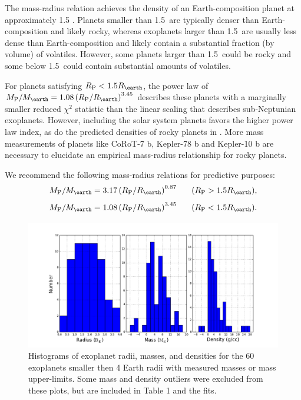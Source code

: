 \documentclass[iop]{emulateapj}
\begin{document}
The mass-radius relation achieves the density of an Earth-composition planet at approximately 1.5 \rearth.   Planets smaller than 1.5\rearth\ are typically denser than Earth-composition and likely rocky, whereas exoplanets larger than 1.5\rearth\ are usually less dense than Earth-composition and likely contain a substantial fraction (by volume) of volatiles.  However, some planets larger than 1.5\rearth\ could be rocky and some below 1.5\rearth\ could contain substantial amounts of volatiles.

For planets satisfying $\rpl < 1.5 \rearth$, the power law of $\mpl/\mearth = 1.08 \left(\rpl/\rearth\right)^{3.45}$ describes these planets with a marginally smaller reduced $\chi^2$ statistic than the linear scaling that describes sub-Neptunian exoplanets.  However, including the solar system planets favors the higher power law index, as do the predicted densities of rocky planets in \citet{Seager2007}.  More mass measurements of planets like CoRoT-7 b, Kepler-78 b and Kepler-10 b are necessary to elucidate an empirical mass-radius relationship for rocky planets.

We recommend the following mass-radius relations for predictive purposes:  $$\mpl/\mearth = 3.17 \left(\rpl/\rearth \right)^{0.87} ~~~~~(\rpl > 1.5\rearth),$$ $$\mpl/\mearth = 1.08 \left(\rpl/\rearth\right)^{3.45} ~~~~~(\rpl < 1.5\rearth).$$



\begin{figure}[htbp] %
   \centering
   \includegraphics[width=6in]{histograms.png} 
   \caption{\small Histograms of exoplanet radii, masses, and densities for the 60 exoplanets smaller then 4 Earth radii with measured masses or mass upper-limits.  Some mass and density outliers were excluded from these plots, but are included in Table 1 and the fits.}
\label{fig:histograms}
\end{figure}
\end{document}
